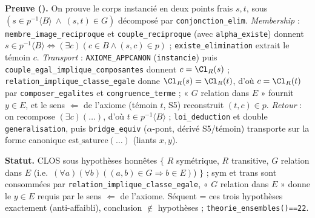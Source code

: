 \textbf{Preuve (\Nstar).} On prouve le corps instancié en deux points frais $s, t$, sous
$(s \in p^{-1}\langle B\rangle \ \wedge\ (s,t)\in G)$ décomposé par \texttt{conjonction\_elim}.
\emph{Membership} : \texttt{membre\_image\_reciproque} et \texttt{couple\_reciproque} (avec
\texttt{alpha\_existe}) donnent $s \in p^{-1}\langle B\rangle \Leftrightarrow (\exists c)(c\in B \wedge (s,c)\in p)$ ;
\texttt{existe\_elimination} extrait le témoin $c$. \emph{Transport} : \texttt{AXIOME\_APPCANON}
(\texttt{instancie}) puis \texttt{couple\_egal\_implique\_composantes} donnent $c = \Cl_R(s)$ ;
\texttt{relation\_implique\_classe\_egale} donne $\Cl_R(s)=\Cl_R(t)$, d'où $c = \Cl_R(t)$ par
\texttt{composer\_egalites} et \texttt{congruence\_terme} ; « $G$ relation dans $E$ » fournit $y\in E$,
et le sens $\Leftarrow$ de l'axiome (témoin $t$, S5) reconstruit $(t,c)\in p$. \emph{Retour} : on
recompose $(\exists c)(\ldots)$, d'où $t \in p^{-1}\langle B\rangle$ ; \texttt{loi\_deduction} et double
\texttt{generalisation}, puis \texttt{bridge\_equiv} ($\alpha$-pont, dérivé S5/témoin) transporte sur
la forme canonique $\mathrm{est\_saturee}(\ldots)$ (liants $x, y$).

\textbf{Statut.} CLOS sous hypothèses honnêtes $\{$ $R$ symétrique, $R$ transitive, $G$ relation dans
$E$ (i.e.\ $(\forall a)(\forall b)((a,b)\in G \Rightarrow b\in E)$) $\}$ ; sym et trans sont consommées
par \texttt{relation\_implique\_classe\_egale}, « $G$ relation dans $E$ » donne le $y\in E$ requis par
le sens $\Leftarrow$ de l'axiome. Séquent = ces trois hypothèses exactement (anti-affaibli),
conclusion $\notin$ hypothèses ; \texttt{theorie\_ensembles()==22}.
